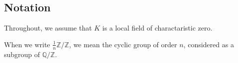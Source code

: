 %
%
%

\subsection{Notation}

Throughout, we assume that \(K\) is a local field
of charactaristic zero. 

When we write \(\frac{1}{n}\mathbb{Z} / \mathbb{Z}\), we mean
the cyclic group of order \(n\), considered as a subgroup of
\(\mathbb{Q} / \mathbb{Z}\).

